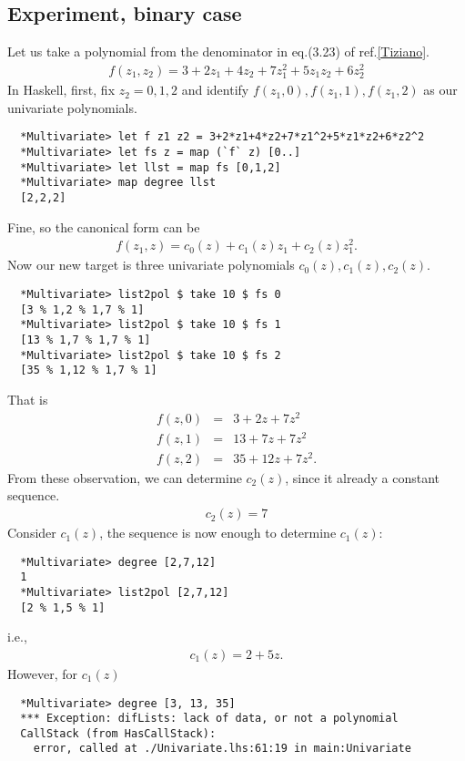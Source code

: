 \documentclass[11pt]{book}
\begin{document}
\subsection{Experiment, binary case}
Let us take a polynomial from the denominator in eq.(3.23) of ref.\ref{Tiziano}.
\begin{eqnarray}
f(z_1,z_2) = 3 + 2z_1 + 4z_2 + 7z_1^2 + 5z_1z_2 + 6z_2^2
\end{eqnarray}
In Haskell, first, fix $z_2=0,1,2$ and identify $f(z_1, 0), f(z_1,1), f(z_1,2)$ as our univariate polynomials.
\begin{verbatim}
  *Multivariate> let f z1 z2 = 3+2*z1+4*z2+7*z1^2+5*z1*z2+6*z2^2
  *Multivariate> let fs z = map (`f` z) [0..]
  *Multivariate> let llst = map fs [0,1,2]
  *Multivariate> map degree llst
  [2,2,2]
\end{verbatim}
Fine, so the canonical form can be
\begin{eqnarray}
f(z_1, z) = c_0(z) + c_1(z)z_1 + c_2(z) z_1^2.
\end{eqnarray}
Now our new target is three univariate polynomials $c_0(z), c_1(z), c_2(z)$.
\begin{verbatim}
  *Multivariate> list2pol $ take 10 $ fs 0
  [3 % 1,2 % 1,7 % 1]
  *Multivariate> list2pol $ take 10 $ fs 1
  [13 % 1,7 % 1,7 % 1]
  *Multivariate> list2pol $ take 10 $ fs 2
  [35 % 1,12 % 1,7 % 1]
\end{verbatim}
That is
\begin{eqnarray}
f(z,0) &=& 3+ 2z+7z^2 \\
f(z,1) &=& 13 + 7z + 7z^2 \\
f(z,2) &=& 35 + 12z + 7z^2.
\end{eqnarray}
From these observation, we can determine $c_2(z)$, since it already a constant sequence.
\begin{eqnarray}
c_2(z) = 7
\end{eqnarray}
Consider $c_1(z)$, the sequence is now enough to determine $c_1(z)$:
\begin{verbatim}
  *Multivariate> degree [2,7,12]
  1
  *Multivariate> list2pol [2,7,12]
  [2 % 1,5 % 1]
\end{verbatim}
i.e.,
\begin{eqnarray}
c_1(z) = 2 + 5z.
\end{eqnarray}
However, for $c_1(z)$
\begin{verbatim}
  *Multivariate> degree [3, 13, 35]
  *** Exception: difLists: lack of data, or not a polynomial
  CallStack (from HasCallStack):
    error, called at ./Univariate.lhs:61:19 in main:Univariate
\end{verbatim}
\end{document}

